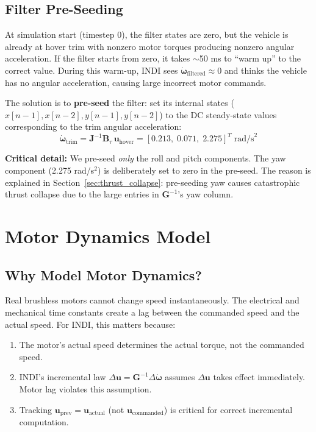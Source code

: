 \documentclass[12pt, a4paper]{article}
\newcommand{\bu}{\bm{u}}
\newcommand{\bomega}{\bm{\omega}}
\newcommand{\bJ}{\bm{J}}
\newcommand{\bB}{\bm{B}}
\begin{document}
\subsection{Filter Pre-Seeding}

At simulation start (timestep 0), the filter states are zero, but the vehicle is already at hover trim with nonzero motor torques producing nonzero angular acceleration.  If the filter starts from zero, it takes $\sim$50 ms to ``warm up'' to the correct value.  During this warm-up, INDI sees $\dot{\bomega}_{\text{filtered}} \approx 0$ and thinks the vehicle has no angular acceleration, causing large incorrect motor commands.

The solution is to \textbf{pre-seed} the filter: set its internal states ($x[n{-}1], x[n{-}2], y[n{-}1], y[n{-}2]$) to the DC steady-state values corresponding to the trim angular acceleration:
\begin{equation}
    \dot{\bomega}_{\text{trim}} = \bJ^{-1} \bB_\tau \, \bu_{\text{hover}} = [0.213, \; 0.071, \; 2.275]^T \; \text{rad/s}^2
\end{equation}

\textbf{Critical detail:} We pre-seed \emph{only} the roll and pitch components.  The yaw component (2.275 rad/s$^2$) is deliberately set to zero in the pre-seed.  The reason is explained in Section~\ref{sec:thrust_collapse}: pre-seeding yaw causes catastrophic thrust collapse due to the large entries in $\bm{G}^{-1}$'s yaw column.

\section{Motor Dynamics Model}
\label{sec:motor_model}

\subsection{Why Model Motor Dynamics?}

Real brushless motors cannot change speed instantaneously.  The electrical and mechanical time constants create a lag between the commanded speed and the actual speed.  For INDI, this matters because:

\begin{enumerate}
    \item The motor's actual speed determines the actual torque, not the commanded speed.
    \item INDI's incremental law $\Delta\bu = \bm{G}^{-1}\Delta\dot{\bomega}$ assumes $\Delta\bu$ takes effect immediately.  Motor lag violates this assumption.
    \item Tracking $\bu_{\text{prev}} = \bu_{\text{actual}}$ (not $\bu_{\text{commanded}}$) is critical for correct incremental computation.
\end{enumerate}
\end{document}
